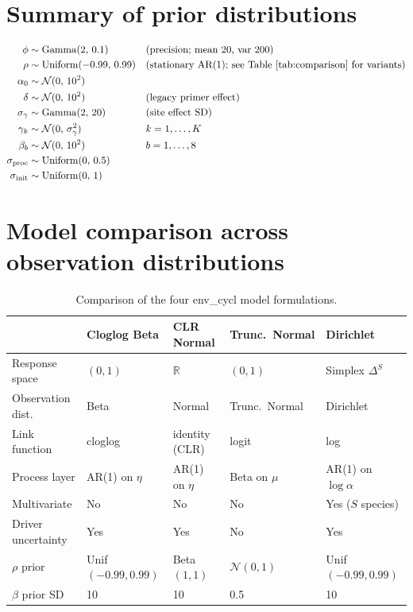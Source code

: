 \documentclass[11pt]{article}
\begin{document}
\section{Summary of prior distributions}

\begin{align}
\phi &\sim \mathrm{Gamma}(2,\, 0.1) & &\text{(precision; mean 20, var 200)} \notag\\
\rho &\sim \mathrm{Uniform}(-0.99,\, 0.99) & &\text{(stationary AR(1); see Table~\ref{tab:comparison} for variants)} \notag\\
\alpha_0 &\sim \mathcal{N}(0,\, 10^2) \notag\\
\delta &\sim \mathcal{N}(0,\, 10^2) & &\text{(legacy primer effect)} \notag\\
\sigma_{\gamma} &\sim \mathrm{Gamma}(2,\, 20) & &\text{(site effect SD)} \notag\\
\gamma_k &\sim \mathcal{N}(0,\, \sigma_{\gamma}^2) & &k = 1,\dots,K \notag\\
\beta_b &\sim \mathcal{N}(0,\, 10^2) & &b = 1,\dots,8 \notag\\
\sigma_{\mathrm{proc}} &\sim \mathrm{Uniform}(0,\, 0.5) \notag\\
\sigma_{\mathrm{init}} &\sim \mathrm{Uniform}(0,\, 1) \notag
\end{align}


\section{Model comparison across observation distributions}

\begin{table}[ht]
\centering
\small
\begin{tabular}{@{}lllll@{}}
\toprule
& \textbf{Cloglog Beta} & \textbf{CLR Normal} & \textbf{Trunc.\ Normal} & \textbf{Dirichlet} \\
\midrule
Response space & $(0,1)$ & $\mathbb{R}$ & $(0,1)$ & Simplex $\Delta^S$ \\
Observation dist. & Beta & Normal & Trunc.\ Normal & Dirichlet \\
Link function & cloglog & identity (CLR) & logit & log \\
Process layer & AR(1) on $\eta$ & AR(1) on $\eta$ & Beta on $\mu$ & AR(1) on $\log\alpha$ \\
Multivariate & No & No & No & Yes ($S$ species) \\
Driver uncertainty & Yes & Yes & No & Yes \\
$\rho$ prior & Unif$(-0.99, 0.99)$ & Beta$(1,1)$ & $\mathcal{N}(0,1)$ & Unif$(-0.99, 0.99)$ \\
$\beta$ prior SD & 10 & 10 & 0.5 & 10 \\
\bottomrule
\end{tabular}
\caption{Comparison of the four env\_cycl model formulations.}
\label{tab:comparison}
\end{table}
\end{document}
